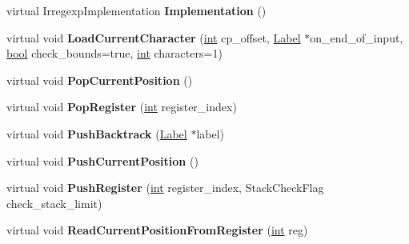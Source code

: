 \begin{DoxyCompactItemize}
virtual Irregexp\+Implementation {\bfseries Implementation} ()
\item 
\mbox{\label{classv8_1_1internal_1_1RegExpMacroAssemblerARM64_a53d27bac62d9082ecdc4f54a84edb680}} 
virtual void {\bfseries Load\+Current\+Character} (\mbox{\hyperlink{classint}{int}} cp\+\_\+offset, \mbox{\hyperlink{classv8_1_1internal_1_1Label}{Label}} $\ast$on\+\_\+end\+\_\+of\+\_\+input, \mbox{\hyperlink{classbool}{bool}} check\+\_\+bounds=true, \mbox{\hyperlink{classint}{int}} characters=1)
\item 
\mbox{\label{classv8_1_1internal_1_1RegExpMacroAssemblerARM64_a7b6bee4e19011e02136e91377cefc38d}} 
virtual void {\bfseries Pop\+Current\+Position} ()
\item 
\mbox{\label{classv8_1_1internal_1_1RegExpMacroAssemblerARM64_a8acbb3d815f6807cd8564ec9b660f8a9}} 
virtual void {\bfseries Pop\+Register} (\mbox{\hyperlink{classint}{int}} register\+\_\+index)
\item 
\mbox{\label{classv8_1_1internal_1_1RegExpMacroAssemblerARM64_a77e6fab918a2b8b5ecf4660fd7e99f01}} 
virtual void {\bfseries Push\+Backtrack} (\mbox{\hyperlink{classv8_1_1internal_1_1Label}{Label}} $\ast$label)
\item 
\mbox{\label{classv8_1_1internal_1_1RegExpMacroAssemblerARM64_a9532d11e4c228febdb9076cdddbc1c8a}} 
virtual void {\bfseries Push\+Current\+Position} ()
\item 
\mbox{\label{classv8_1_1internal_1_1RegExpMacroAssemblerARM64_af0d4ab0dbce57686396da5ff5a4268eb}} 
virtual void {\bfseries Push\+Register} (\mbox{\hyperlink{classint}{int}} register\+\_\+index, Stack\+Check\+Flag check\+\_\+stack\+\_\+limit)
\item 
\mbox{\label{classv8_1_1internal_1_1RegExpMacroAssemblerARM64_a67276bbc53937eeb036d9b7ba441c17c}} 
virtual void {\bfseries Read\+Current\+Position\+From\+Register} (\mbox{\hyperlink{classint}{int}} reg)

\end{DoxyCompactItemize}
